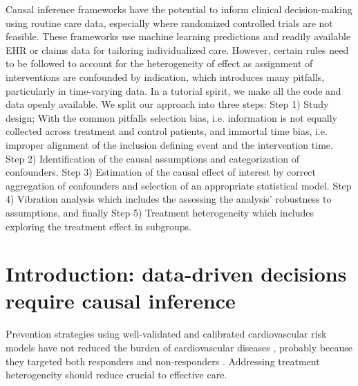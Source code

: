 \documentclass[10pt,letterpaper]{article}
\begin{document}
Causal inference frameworks have the potential to inform clinical
decision-making using routine care data, especially where randomized controlled
trials are not feasible. These frameworks use machine learning predictions and
readily available EHR or claims data for tailoring individualized care. However,
certain rules need to be followed to account for the heterogeneity of effect as
assignment of interventions are confounded by indication, which introduces many
pitfalls, particularly in time-varying data. In a tutorial spirit, we make all
the code and data openly available. We split our approach into three steps: Step
1) Study design; With the common pitfalls selection bias, i.e. information is
not equally collected across treatment and control patients, and immortal time
bias, i.e. improper alignment of the inclusion defining event and the
intervention time. Step 2) Identification of the causal assumptions and
categorization of confounders. Step 3) Estimation of the causal effect of
interest by correct aggregation of confounders and selection of an appropriate
statistical model. Step 4) Vibration analysis which includes the assessing the
analysis' robustness to assumptions, and finally Step 5) Treatment heterogeneity
which includes exploring the treatment effect in subgroups.


\linenumbers

\section*{Introduction: data-driven decisions require causal inference}


Prevention strategies using
well-validated and calibrated cardiovascular risk models have not reduced the
burden of cardiovascular diseases \cite{eriksen2021effectiveness}, probably because they targeted both
responders and non-responders  \cite{krska2016implementation}. Addressing treatment heterogeneity should reduce  crucial to
effective care.
\end{document}

